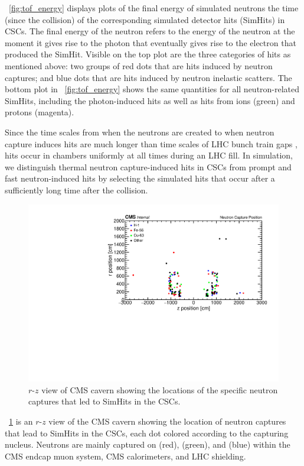 \Fig~\ref{fig:tof_energy} displays plots of the final energy of simulated neutrons \vs the time (since the \pp collision) of the corresponding simulated detector hits (SimHits) in CSCs. The final energy of the neutron refers to the energy of the neutron at the moment it gives rise to the photon that eventually gives rise to the electron that produced the SimHit. Visible on the top plot are the three categories of hits as mentioned above: two groups of red dots that are hits induced by neutron captures; and blue dots that are hits induced by neutron inelastic scatters. The bottom plot in \FigDot~\ref{fig:tof_energy} shows the same quantities for all neutron-related SimHits, including the photon-induced hits as well as hits from ions (green) and protons (magenta).

Since the time scales from when the neutrons are created to when neutron capture induces hits are much longer than time scales of LHC bunch train gaps \cite{Evans:2008zzb}, hits occur in chambers uniformly at all times during an LHC fill. In simulation, we distinguish thermal neutron capture-induced hits in CSCs from prompt and fast neutron-induced hits by selecting the simulated hits that occur after a sufficiently long time after the \pp collision. 

\begin{figure}
	\centering
	\includegraphics[width=\dummyFigWidth]{figures/neutron/hrzTot_sim_nCapture.pdf}
	\caption{$r$-$z$ view of CMS cavern showing the locations of the specific neutron captures that led to SimHits in the CSCs.}
	\label{fig:hrz_neutron_cap}
\end{figure}

\Fig~\ref{fig:hrz_neutron_cap} is an $r$-$z$ view of the CMS cavern showing the location of neutron captures that lead to SimHits in the CSCs, each dot colored according to the capturing nucleus. Neutrons are mainly captured on  (red),  (green), and  (blue) within the CMS endcap muon system, CMS calorimeters, and LHC shielding.

